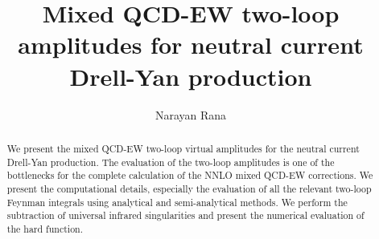 \documentclass[a4paper]{jpconf}
\begin{document}
\title{Mixed QCD-EW two-loop amplitudes for neutral current Drell-Yan production}

\author{Narayan Rana}

\address{Department of Physics, Indian Institute of Technology Kanpur, 208016 Kanpur, India
}



\begin{abstract}
We present the mixed QCD-EW two-loop virtual amplitudes for the neutral current Drell-Yan production. The evaluation of the two-loop amplitudes is one of the bottlenecks for the complete calculation of the NNLO mixed QCD-EW corrections. We present the computational details, especially the evaluation of all the relevant two-loop Feynman integrals using analytical and semi-analytical methods. We perform the subtraction of universal infrared singularities and present the numerical evaluation of the hard function.
\end{abstract}






\def\D{{\cal D}}
\def\DD{\overline{\cal D}}
\def\g{\overline{\cal G}}
\def\gm{\gamma}
\def\M{{\cal M}}
\def\ep{\epsilon}
\def\epm1{\frac{1}{\epsilon}}
\def\epm2{\frac{1}{\epsilon^{2}}}
\def\epm3{\frac{1}{\epsilon^{3}}}
\def\epm4{\frac{1}{\epsilon^{4}}}
\def\unM{\hat{\cal M}}
\def\ashat{\hat{a}_{s}}
\def\asmur{a_{s}^{2}(\mu_{R}^{2})}
\def\sigbar{{{\overline {\sigma}}}\left(a_{s}(\mu_{R}^{2}), L\left(\mu_{R}^{2}, m_{H}^{2}\right)\right)}
\def\sigbarn{{{{\overline \sigma}}_{n}\left(a_{s}(\mu_{R}^{2}) L\left(\mu_{R}^{2}, m_{H}^{2}\right)\right)}}
\def\unas{ \left( \frac{\hat{a}_s}{\mu_0^{\epsilon}} S_{\epsilon} \right) }
\def\rnM{{\cal M}}
\def\bt{\beta}
\def\cD{{\cal D}}
\def\cC{{\cal C}}
\def\ca{\text{\tiny C}_\text{\tiny A}}
\def\cf{\text{\tiny C}_\text{\tiny F}}
\def\ct{{\red []}}
\def\sv{\text{SV}}
\def\murOmu{\left( \frac{\mu_{R}^{2}}{\mu^{2}} \right)}
\def\bb{b{\bar{b}}}
\def\bt0{\beta_{0}}
\def\bt1{\beta_{1}}
\def\bt2{\beta_{2}}
\def\bt3{\beta_{3}}
\def\gm0{\gamma_{0}}
\def\gm1{\gamma_{1}}
\def\gm2{\gamma_{2}}
\def\gm3{\gamma_{3}}
\def\nn{\nonumber}
\def\l{\left}
\def\r{\right}
\def\nn{\nonumber \\&}

\def\asr{\left( \frac{\alpha_s}{4 \pi} \right)}
\def\asrhat{\left( \frac{\hat\alpha_s}{4 \pi} \right)}
\def\aem{\left( \frac{\alpha}{4 \pi} \right)}
\def\uaem{\left( \frac{\hat\alpha}{4 \pi} \right)}
\def\smu{\left( \frac{s}{\mu^2} \right)}
\def\J{{\cal J}}
\def\S{{\cal S}}
\def\I{{\cal I}}
\end{document}
